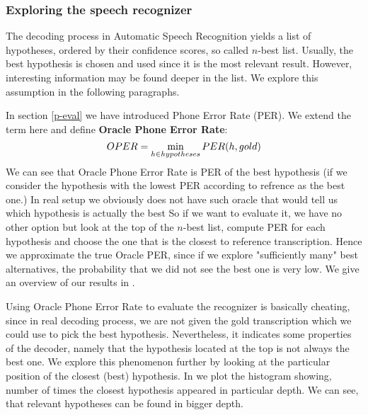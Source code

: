 \subsubsection{Exploring the speech recognizer}
\label{nbest-detail}
The decoding process in Automatic Speech Recognition yields a list of hypotheses, ordered by their confidence scores, so called $n$-best list.
Usually, the best hypothesis is chosen and used since it is the most relevant result.
However, interesting information may be found deeper in the list.
We explore this assumption in the following paragraphs.
\par
In section \ref{p-eval} we have introduced Phone Error Rate (PER).
We extend the term here and define \textbf{Oracle Phone Error Rate}:
\begin{equation}
OPER = \operatorname*{min}_{h \in hypotheses} PER(h, gold)
\end{equation}
We can see that Oracle Phone Error Rate is PER of the best hypothesis (if we consider the hypothesis with the lowest PER according to refrence as the best one.)
In real setup we obviously does not have such oracle that would tell us which hypothesis is actually the best
So if we want to evaluate it, we have no other option but look at the top of the $n$-best list, compute PER for each hypothesis and choose the one that is the closest to reference transcription.
Hence we approximate the true Oracle PER, since if we explore "sufficiently many" best alternatives, the probability that we did not see the best one is very low.
We give an overview of our results in .
\par
Using Oracle Phone Error Rate to evaluate the recognizer is basically cheating, since in real decoding process, we are not given the gold transcription which we could use to pick the best hypothesis.
Nevertheless, it indicates some properties of the decoder, namely that the hypothesis located at the top is not always the best one.
We explore this phenomenon further by looking at the particular position of the closest (best) hypothesis.
In  we plot the histogram showing, number of times the closest hypothesis appeared in particular depth.
We can see, that relevant hypotheses can be found in bigger depth.
